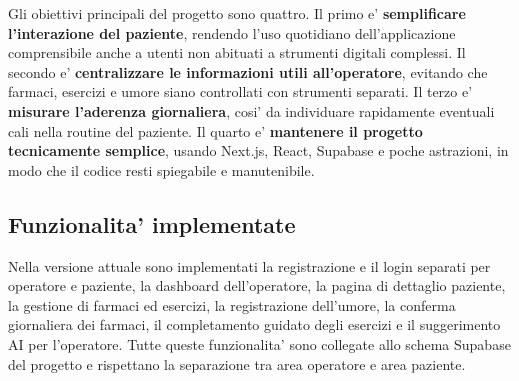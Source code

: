 Gli obiettivi principali del progetto sono quattro. Il primo e' \textbf{semplificare l'interazione del paziente}, rendendo l'uso quotidiano dell'applicazione comprensibile anche a utenti non abituati a strumenti digitali complessi. Il secondo e' \textbf{centralizzare le informazioni utili all'operatore}, evitando che farmaci, esercizi e umore siano controllati con strumenti separati. Il terzo e' \textbf{misurare l'aderenza giornaliera}, cosi' da individuare rapidamente eventuali cali nella routine del paziente. Il quarto e' \textbf{mantenere il progetto tecnicamente semplice}, usando Next.js, React, Supabase e poche astrazioni, in modo che il codice resti spiegabile e manutenibile.

\subsection{Funzionalita' implementate}

Nella versione attuale sono implementati la registrazione e il login separati per operatore e paziente, la dashboard dell'operatore, la pagina di dettaglio paziente, la gestione di farmaci ed esercizi, la registrazione dell'umore, la conferma giornaliera dei farmaci, il completamento guidato degli esercizi e il suggerimento AI per l'operatore. Tutte queste funzionalita' sono collegate allo schema Supabase del progetto e rispettano la separazione tra area operatore e area paziente.

\newpage
